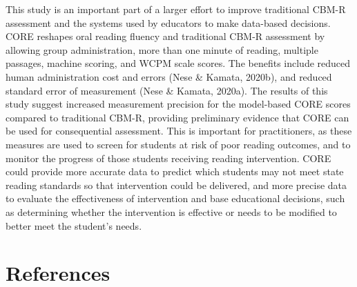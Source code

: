 \documentclass[
  english,
  man, fleqn, noextraspace]{apa6}
\begin{document}
This study is an important part of a larger effort to improve traditional CBM-R assessment and the systems used by educators to make data-based decisions. CORE reshapes oral reading fluency and traditional CBM-R assessment by allowing group administration, more than one minute of reading, multiple passages, machine scoring, and WCPM scale scores. The benefits include reduced human administration cost and errors (Nese \& Kamata, 2020b), and reduced standard error of measurement (Nese \& Kamata, 2020a). The results of this study suggest increased measurement precision for the model-based CORE scores compared to traditional CBM-R, providing preliminary evidence that CORE can be used for consequential assessment. This is important for practitioners, as these measures are used to screen for students at risk of poor reading outcomes, and to monitor the progress of those students receiving reading intervention. CORE could provide more accurate data to predict which students may not meet state reading standards so that intervention could be delivered, and more precise data to evaluate the effectiveness of intervention and base educational decisions, such as determining whether the intervention is effective or needs to be modified to better meet the student's needs.

\newpage

\hypertarget{references}{%
\section{References}\label{references}}

\begingroup
\setlength{\parindent}{-0.5in}
\setlength{\leftskip}{0.5in}
\end{document}
